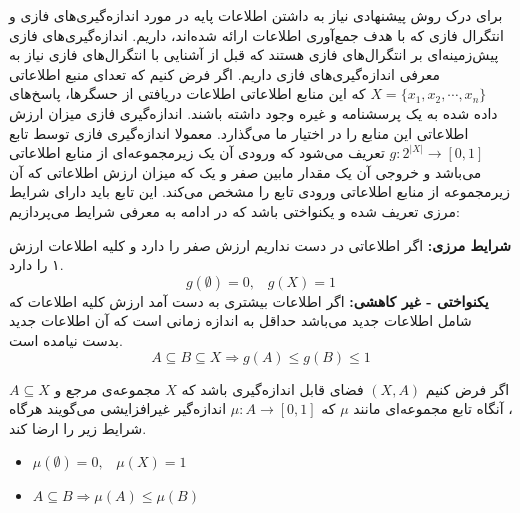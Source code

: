 \label{SEC:FI_PREVIEW}
برای درک روش پیشنهادی نیاز به داشتن اطلاعات پایه در مورد اندازه‌گیری‌های فازی و انتگرال فازی که با هدف جمع‌آوری اطلاعات ارائه شده‌اند، داریم. اندازه‌گیری‌های فازی پیش‌زمینه‌ای بر انتگرال‌های فازی هستند که قبل از آشنایی با انتگرال‌های فازی نیاز به معرفی اندازه‌گیری‌های فازی داریم. اگر فرض کنیم که تعدای منبع اطلاعاتی
$X = \{x_1, x_2, \cdots, x_n\}$
که این منابع اطلاعاتی اطلاعات دریافتی از حسگرها، پاسخ‌های داده شده به یک پرسشنامه و غیره وجود داشته باشند. اندازه‌گیری فازی میزان ارزش اطلاعاتی این منابع را در اختیار ما می‌گذارد. معمولا اندازه‌گیری فازی توسط تابع
$g : 2^{|X|} \rightarrow [0, 1]$
تعریف می‌شود که ورودی آن یک زیرمجموعه‌ای از منابع اطلاعاتی می‌باشد و خروجی آن یک مقدار مابین صفر و یک که میزان ارزش اطلاعاتی که آن زیرمجموعه از منابع اطلاعاتی ورودی تابع را مشخص می‌کند.
این تابع باید دارای شرایط مرزی تعریف شده و یکنواختی باشد که در ادامه به معرفی شرایط می‌پردازیم:

\begin{enumerate}
 \textbf{شرایط مرزی:}
اگر اطلاعاتی در دست نداریم ارزش صفر را دارد و کلیه اطلاعات ارزش ۱ را دارد.
\begin{equation}
g(\emptyset) = 0,\hspace{10pt} g(X) = 1
\end{equation}
 \textbf{یکنواختی - غیر کاهشی:}
اگر اطلاعات بیشتری به دست آمد ارزش کلیه اطلاعات که شامل اطلاعات جدید می‌باشد حداقل به اندازه زمانی است که آن اطلاعات جدید بدست نیامده است.
\begin{equation}
A \subseteq B \subseteq X \Rightarrow g(A) \leq g(B) \leq 1
\end{equation}
\end{enumerate}

\begin{definition}\setstretch{\thebaselinestretch}\label{non_additive_definition}
اگر فرض کنیم $(X, A)$ فضای قابل اندازه‌گیری باشد که $X$ مجموعه‌ی مرجع و $A \subseteq X$، آنگاه تابع مجموعه‌ای مانند $\mu$ که $\mu: A \rightarrow [0, 1]$ اندازه‌گیر غیرافزایشی می‌گویند هرگاه شرایط زیر را ارضا کند.

\begin{latin}
\begin{itemize}
\item $\mu(\emptyset) = 0, \hspace{10pt} \mu(X) = 1$
\item $A \subseteq B \Rightarrow \mu(A) \leq \mu(B)$
\end{itemize}
\end{latin}
\end{definition}

